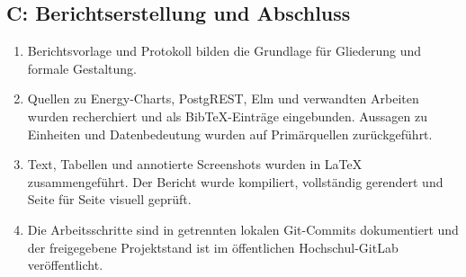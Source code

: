 \subsection*{C: Berichtserstellung und Abschluss}

\begin{enumerate}
  \item Berichtsvorlage und Protokoll bilden die Grundlage für Gliederung und
    formale Gestaltung.
  \item Quellen zu Energy-Charts, PostgREST, Elm und verwandten Arbeiten wurden
    recherchiert und als BibTeX-Einträge eingebunden. Aussagen zu Einheiten und
    Datenbedeutung wurden auf Primärquellen zurückgeführt.
  \item Text, Tabellen und annotierte Screenshots wurden in LaTeX
    zusammengeführt. Der Bericht wurde kompiliert, vollständig gerendert und
    Seite für Seite visuell geprüft.
  \item Die Arbeitsschritte sind in getrennten lokalen Git-Commits dokumentiert
    und der freigegebene Projektstand ist im öffentlichen Hochschul-GitLab
    veröffentlicht.
\end{enumerate}
